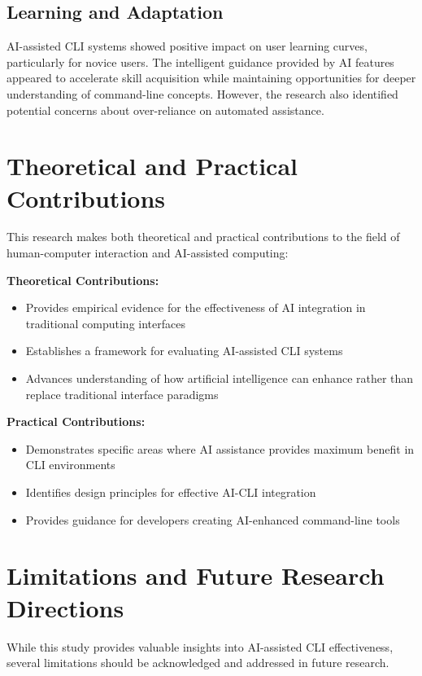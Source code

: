 \subsection{Learning and Adaptation}

AI-assisted CLI systems showed positive impact on user learning curves, particularly for novice users. The intelligent guidance provided by AI features appeared to accelerate skill acquisition while maintaining opportunities for deeper understanding of command-line concepts. However, the research also identified potential concerns about over-reliance on automated assistance.

\section{Theoretical and Practical Contributions}

This research makes both theoretical and practical contributions to the field of human-computer interaction and AI-assisted computing:

\textbf{Theoretical Contributions:}
\begin{itemize}
	\item Provides empirical evidence for the effectiveness of AI integration in traditional computing interfaces
	\item Establishes a framework for evaluating AI-assisted CLI systems
	\item Advances understanding of how artificial intelligence can enhance rather than replace traditional interface paradigms
\end{itemize}

\textbf{Practical Contributions:}
\begin{itemize}
	\item Demonstrates specific areas where AI assistance provides maximum benefit in CLI environments
	\item Identifies design principles for effective AI-CLI integration
	\item Provides guidance for developers creating AI-enhanced command-line tools
\end{itemize}

\section{Limitations and Future Research Directions}

While this study provides valuable insights into AI-assisted CLI effectiveness, several limitations should be acknowledged and addressed in future research.

